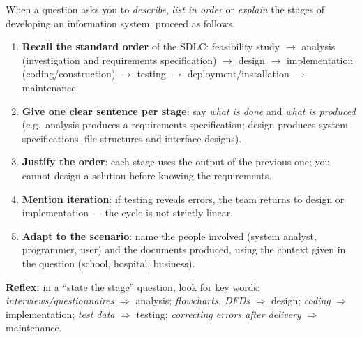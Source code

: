 \documentclass[11pt]{article}
\newcommand{\cle}[1]{{\popxbold\color{popdark}#1}}
\begin{document}
\begin{methode}
When a question asks you to \emph{describe}, \emph{list in order} or \emph{explain} the stages of developing an information system, proceed as follows.
\begin{enumerate}
\item \textbf{Recall the standard order} of the SDLC: \cle{feasibility study} $\rightarrow$ \cle{analysis} (investigation and requirements specification) $\rightarrow$ \cle{design} $\rightarrow$ \cle{implementation} (coding/construction) $\rightarrow$ \cle{testing} $\rightarrow$ \cle{deployment/installation} $\rightarrow$ \cle{maintenance}.
\item \textbf{Give one clear sentence per stage}: say \emph{what is done} and \emph{what is produced} (e.g.\ analysis produces a requirements specification; design produces system specifications, file structures and interface designs).
\item \textbf{Justify the order}: each stage uses the output of the previous one; you cannot design a solution before knowing the requirements.
\item \textbf{Mention iteration}: if testing reveals errors, the team returns to design or implementation — the cycle is not strictly linear.
\item \textbf{Adapt to the scenario}: name the people involved (system analyst, programmer, user) and the documents produced, using the context given in the question (school, hospital, business).
\end{enumerate}
\textbf{Reflex:} in a ``state the stage'' question, look for key words: \emph{interviews/questionnaires} $\Rightarrow$ analysis; \emph{flowcharts, DFDs} $\Rightarrow$ design; \emph{coding} $\Rightarrow$ implementation; \emph{test data} $\Rightarrow$ testing; \emph{correcting errors after delivery} $\Rightarrow$ maintenance.
\end{methode}
\end{document}
